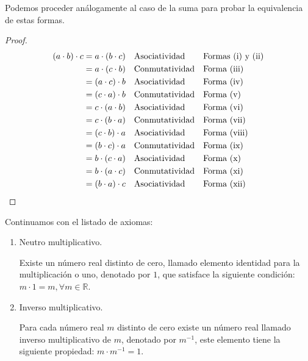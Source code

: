 \documentclass[11pt]{article}
\newcommand{\R}{\mathbb{R}}
\begin{document}
Podemos proceder análogamente al caso de la suma para probar la equivalencia de estas formas.

\vspace{-1em}\begin{proof} \begin{align*}
    (a\cdot b)\cdot c &= a\cdot (b\cdot c) && \text{Asociatividad} && \text{Formas (i) y (ii)}\\
    &= a\cdot (c\cdot b) && \text{Conmutatividad} && \text{Forma (iii)}\\
    &= (a\cdot c)\cdot b && \text{Asociatividad} && \text{Forma (iv)}\\
    &= (c\cdot a)\cdot b && \text{Conmutatividad}&& \text{Forma (v)}\\
    &= c\cdot (a\cdot b) && \text{Asociatividad}&& \text{Forma (vi)}\\
    &= c\cdot (b\cdot a) && \text{Conmutatividad}&& \text{Forma (vii)}\\
    &= (c\cdot b)\cdot a && \text{Asociatividad}&& \text{Forma (viii)}\\
    &= (b\cdot c)\cdot a && \text{Conmutatividad}&& \text{Forma (ix)}\\
    &= b\cdot (c\cdot a) && \text{Asociatividad}&& \text{Forma (x)}\\
    &= b\cdot (a\cdot c) && \text{Conmutatividad}&& \text{Forma (xi)}\\
    &= (b\cdot a)\cdot c && \text{Asociatividad}&& \text{Forma (xii)} \qedhere
\end{align*} \end{proof} \vspace{-1em}

Continuamos con el listado de axiomas:

\begin{enumerate}[label=M\arabic*.]

    \item Neutro multiplicativo.
    
    Existe un número real distinto de cero, llamado elemento identidad para la multiplicación o uno, denotado por $1$, que satisface la siguiente condición: $ m \cdot 1 = m,\forall m \in \R $.

    \item Inverso multiplicativo.
    
    Para cada número real $m$ distinto de cero existe un número real llamado inverso multiplicativo de $m$, denotado por $m^{-1}$, este elemento tiene la siguiente propiedad: $m \cdot m^{-1} = 1$.
\end{enumerate}
\end{document}
